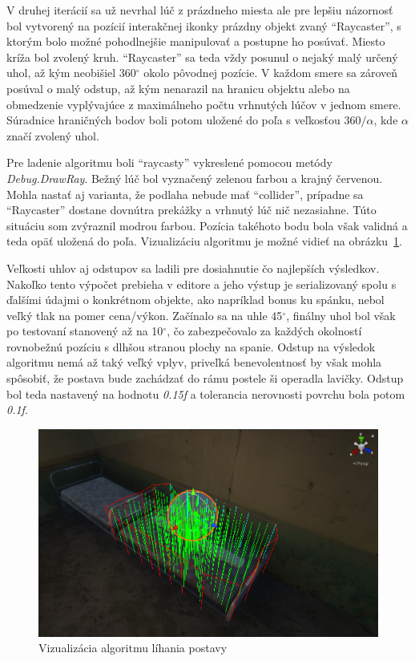 \documentclass[slovak, bachelorpractice]{diploma}
\begin{document}
V druhej iterácií sa už nevrhal lúč z prázdneho miesta ale pre lepšiu názornosť bol vytvorený na pozícií interakčnej ikonky prázdny objekt zvaný \enquote{Raycaster}, s ktorým bolo možné pohodlnejšie manipulovať a postupne ho posúvať. Miesto kríža bol zvolený kruh. \enquote{Raycaster} sa teda vždy posunul o nejaký malý určený uhol, až kým neobišiel 360$^{\circ}$ okolo pôvodnej pozície. V každom smere sa zároveň posúval o malý odstup, až kým nenarazil na hranicu objektu alebo na obmedzenie vyplývajúce z maximálneho počtu vrhnutých lúčov v jednom smere. Súradnice hraničných bodov boli potom uložené do poľa s veľkosťou $360/\alpha$, kde $\alpha$ značí zvolený uhol. 

Pre ladenie algoritmu boli \enquote{raycasty} vykreslené pomocou metódy \textit{Debug.DrawRay}. Bežný lúč bol vyznačený zelenou farbou a krajný červenou. Mohla nastať aj varianta, že podlaha nebude mať \enquote{collider}, prípadne sa \enquote{Raycaster} dostane dovnútra prekážky a vrhnutý lúč nič nezasiahne. Túto situáciu som zvýraznil modrou farbou. Pozícia takéhoto bodu bola však validná a teda opäť uložená do poľa. Vizualizáciu algoritmu je možné vidieť na \mbox{obrázku \ref{pic:algviz}}.

Veľkosti uhlov aj odstupov sa ladili pre dosiahnutie čo najlepších výsledkov. Nakoľko tento výpočet prebieha v editore a jeho výstup je serializovaný spolu s ďalšími údajmi o konkrétnom objekte, ako napríklad bonus ku spánku, nebol veľký tlak na pomer cena/výkon. Začínalo sa na uhle 45$^{\circ}$, finálny uhol bol však po testovaní stanovený až na 10$^{\circ}$, čo zabezpečovalo za každých okolností rovnobežnú pozíciu s dlhšou stranou plochy na spanie. Odstup na výsledok algoritmu nemá až taký veľký vplyv, priveľká benevolentnosť by však mohla spôsobiť, že postava bude zachádzať do rámu postele ši operadla lavičky. Odstup bol teda nastavený na hodnotu \textit{0.15f} a tolerancia nerovnosti povrchu bola potom \textit{0.1f}. 

\begin{figure}[!htbp]
	\centering
	\includegraphics[width=.98\textwidth]{Pictures/algviz.png}
	\caption{Vizualizácia algoritmu líhania postavy}
	\label{pic:algviz}
\end{figure}
\end{document}
